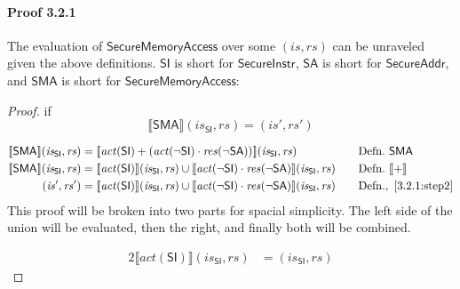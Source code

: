 \documentclass[12pt, letterpaper]{article}
\newcommand\interp[1]{\llbracket #1 \rrbracket}
\begin{document}
 \paragraph{Proof 3.2.1}
     The evaluation of $\mathsf{SecureMemoryAccess}$ over some $(\mathit{is},\mathit{rs})$ can be unraveled given the above definitions.  $\mathsf{SI}$ is short for $\mathsf{SecureInstr}$, $\mathsf{SA}$ is short for $\mathsf{SecureAddr}$, and $\mathsf{SMA}$ is short for $\mathsf{SecureMemoryAccess}$:\\
 \begin{proof}
     if
     \[
     \interp{ \mathsf{SMA} } (\mathit{is_{\mathsf{SI}}}, \mathit{rs})
     =
     (\mathit{is}', \mathit{rs}')
     \]
 \par\nobreak
 {\fontsize{10pt}{12pt}\selectfont
 \begin{alignat}{2}
     \setcounter{equation}{0}
     \label{3.2.1:step1}
     \interp{ \mathsf{SMA} } (\mathit{is_{\mathsf{SI}}}, \mathit{rs})
     &=
     \interp{ \mathit{act}(\mathsf{SI}) +
     (\mathit{act}(\neg\mathsf{SI}) \cdot
      \mathit{res}(\neg\mathsf{SA})) } (\mathit{is_{\mathsf{SI}}}, \mathit{rs})
     &&\quad \text{Defn.}\ \mathsf{SMA}
     \\
     \label{3.2.1:step2}
     \interp{ \mathsf{SMA} } (\mathit{is_{\mathsf{SI}}}, \mathit{rs})
     &=
     \interp{ \mathit{act}(\mathsf{SI}) } (\mathit{is_{\mathsf{SI}}}, \mathit{rs}) \cup %
     \interp{ \mathit{act}(\neg\mathsf{SI}) \cdot
      \mathit{res}(\neg\mathsf{SA}) } (\mathit{is_{\mathsf{SI}}}, \mathit{rs})
     &&\quad \text{Defn.}\ \interp{+}
     \\
     \label{3.2.1:step3}
     (\mathit{is}', \mathit{rs}')
     &=
     \interp{ \mathit{act}(\mathsf{SI}) } (\mathit{is_{\mathsf{SI}}}, \mathit{rs}) \cup %
     \interp{ \mathit{act}(\neg\mathsf{SI}) \cdot
      \mathit{res}(\neg\mathsf{SA}) } (\mathit{is_{\mathsf{SI}}}, \mathit{rs})
     &&\quad \text{Defn.},\ \ref{3.2.1:step2}
 \end{alignat}
 }%
     This proof will be broken into two parts for spacial simplicity.  The left side of the union will be evaluated, then the right, and finally both will be combined.
 \par\nobreak
 {\fontsize{10pt}{12pt}\selectfont
 \begin{alignat}{2}
     \label{3.2.1:step4}
     \interp{ \mathit{act} (\mathsf{SI}) } (\mathit{is_{\mathsf{SI}}}, \mathit{rs})  
     &=
     (\mathit{is_{\mathsf{SI}}}, \mathit{rs})   %

\end{alignat}}
\end{proof}
\end{document}
